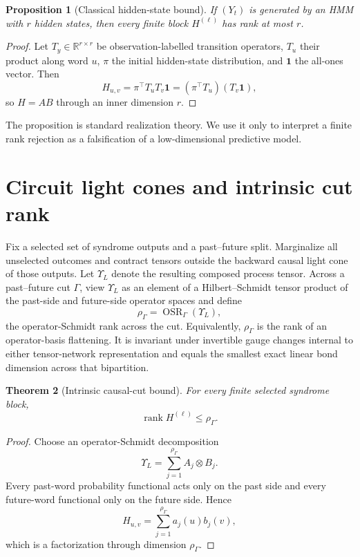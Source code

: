 \documentclass[11pt]{article}
\newtheorem{theorem}{Theorem}[section]
\newtheorem{proposition}[theorem]{Proposition}
\newcommand{\rank}{\operatorname{rank}}
\begin{document}
\begin{proposition}[Classical hidden-state bound]
If $(Y_t)$ is generated by an HMM with $r$ hidden states, then every finite block $H^{(\ell)}$ has rank at most $r$.
\end{proposition}
\begin{proof}
Let $T_y\in\mathbb R^{r\times r}$ be observation-labelled transition operators, $T_u$ their product along word $u$, $\pi$ the initial hidden-state distribution, and $\mathbf1$ the all-ones vector. Then
\[
H_{u,v}=\pi^\top T_uT_v\mathbf1=(\pi^\top T_u)(T_v\mathbf1),
\]
so $H=AB$ through an inner dimension $r$.
\end{proof}

The proposition is standard realization theory. We use it only to interpret a finite rank rejection as a falsification of a low-dimensional predictive model.

\section{Circuit light cones and intrinsic cut rank}
Fix a selected set of syndrome outputs and a past--future split. Marginalize all unselected outcomes and contract tensors outside the backward causal light cone of those outputs. Let $\Upsilon_L$ denote the resulting composed process tensor. Across a past--future cut $\Gamma$, view $\Upsilon_L$ as an element of a Hilbert--Schmidt tensor product of the past-side and future-side operator spaces and define
\begin{equation}
\rho_\Gamma=\operatorname{OSR}_\Gamma(\Upsilon_L),
\label{eq:rho}
\end{equation}
the operator-Schmidt rank across the cut. Equivalently, $\rho_\Gamma$ is the rank of an operator-basis flattening. It is invariant under invertible gauge changes internal to either tensor-network representation and equals the smallest exact linear bond dimension across that bipartition.

\begin{theorem}[Intrinsic causal-cut bound]
For every finite selected syndrome block,
\begin{equation}
\boxed{\rank H^{(\ell)}\le\rho_\Gamma.}
\label{eq:intrinsic}
\end{equation}
\end{theorem}
\begin{proof}
Choose an operator-Schmidt decomposition
\[
\Upsilon_L=\sum_{j=1}^{\rho_\Gamma}A_j\otimes B_j.
\]
Every past-word probability functional acts only on the past side and every future-word functional only on the future side. Hence
\[
H_{u,v}=\sum_{j=1}^{\rho_\Gamma}a_j(u)b_j(v),
\]
which is a factorization through dimension $\rho_\Gamma$.
\end{proof}
\end{document}
